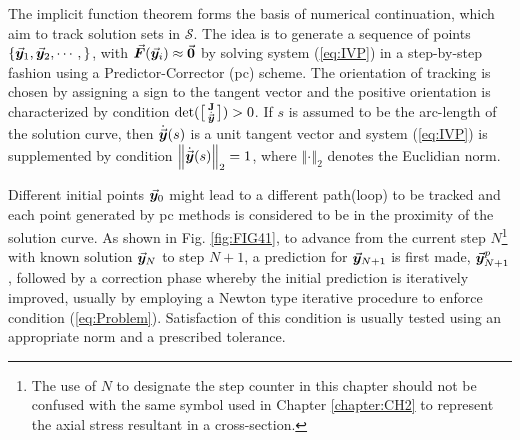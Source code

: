The implicit function theorem forms the basis of numerical
continuation\cite{Allgower:2003,Rheinboldt75,Rheinboldt:2000,Rheinboldt:1980,
Garcia:1980,Watson86,Keller:1978}, which aim to track solution sets in 
$\mathcal{S}$. The idea is to generate a sequence of points
$\{\vec{\bm{y}}_1,\vec{\bm{y}}_2,\cdots,\}$, with 
$\vec{\bm{F}}(\vec{\bm{y}}_i)\approx\vec{\bm{0}}$  by solving system
(\ref{eq:IVP}) in a step-by-step fashion using a Predictor-Corrector 
(\acrshort{pc}) scheme. The orientation of tracking is chosen by assigning a 
sign to the tangent vector and the positive orientation is
characterized by condition $\text{det}(\bigl[
\begin{smallmatrix}
	\mathbf{J} \\ \dot{\vec{\bm{y}}}
\end{smallmatrix}
\bigr]) > 0$. If $s$ is assumed to be the arc-length of the solution curve, then
$\dot{\vec{\bm{y}}}(s)$ is a unit tangent vector and system (\ref{eq:IVP}) is 
supplemented by
condition $\left\Vert \dot{\vec{\bm{y}}}(s)\right\Vert_2=1$, where $\left\Vert
\cdot\right\Vert_2$ denotes the Euclidian norm.

Different initial points $\vec{\bm{y}}_0$ might
lead to a different path(loop) to be tracked and each point generated by 
\acrshort{pc} methods is considered to be in the proximity of the solution 
curve. As shown in Fig. \ref{fig:FIG41}, to advance from the
current step $N$\footnote{The use of $N$ to designate the step counter in this 
chapter should not be confused with the same symbol used in Chapter 
\ref{chapter:CH2} to represent the axial stress resultant in a cross-section.} 
with known solution $\vec{\bm{y}}_N$ to step $N+1$, a
prediction for $\vec{\bm{y}}_{N+1}$ is first made, $\vec{\bm{y}}_{N+1}^p$, followed by 
a 
correction phase 
whereby the initial prediction is iteratively improved, usually by employing a
Newton type iterative procedure to enforce condition (\ref{eq:Problem}). 
Satisfaction of
this condition is usually tested using an appropriate norm and a
prescribed tolerance. 

